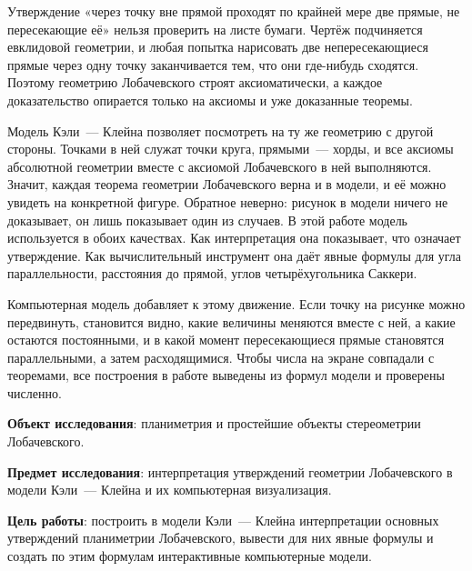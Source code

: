 
Утверждение «через точку вне прямой проходят по крайней мере две прямые, не пересекающие её» нельзя проверить на листе бумаги. Чертёж подчиняется евклидовой геометрии, и любая попытка нарисовать две непересекающиеся прямые через одну точку заканчивается тем, что они где-нибудь сходятся. Поэтому геометрию Лобачевского строят аксиоматически, а каждое доказательство опирается только на аксиомы и уже доказанные теоремы.

Модель Кэли~--- Клейна позволяет посмотреть на ту же геометрию с другой стороны. Точками в ней служат точки круга, прямыми~--- хорды, и все аксиомы абсолютной геометрии вместе с аксиомой Лобачевского в ней выполняются. Значит, каждая теорема геометрии Лобачевского верна и в модели, и её можно увидеть на конкретной фигуре. Обратное неверно: рисунок в модели ничего не доказывает, он лишь показывает один из случаев. В этой работе модель используется в обоих качествах. Как интерпретация она показывает, что означает утверждение. Как вычислительный инструмент она даёт явные формулы для угла параллельности, расстояния до прямой, углов четырёхугольника Саккери.

Компьютерная модель добавляет к этому движение. Если точку на рисунке можно передвинуть, становится видно, какие величины меняются вместе с ней, а какие остаются постоянными, и в какой момент пересекающиеся прямые становятся параллельными, а затем расходящимися. Чтобы числа на экране совпадали с теоремами, все построения в работе выведены из формул модели и проверены численно.

\textbf{Объект исследования}: планиметрия и простейшие объекты стереометрии Лобачевского.

\textbf{Предмет исследования}: интерпретация утверждений геометрии Лобачевского в модели Кэли~--- Клейна и их компьютерная визуализация.

\textbf{Цель работы}: построить в модели Кэли~--- Клейна интерпретации основных утверждений планиметрии Лобачевского, вывести для них явные формулы и создать по этим формулам интерактивные компьютерные модели.

